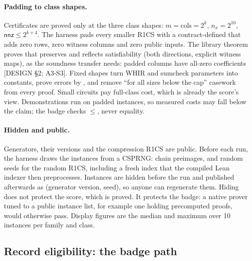 \paragraph{Padding to class shapes.} Certificates are proved only at the three class shapes:
$m=\mathrm{cols}=2^k$, $n_x=2^{10}$, $\mathsf{nnz}\le2^{k+4}$. The harness pads every smaller R1CS
with a contract-defined  that adds zero rows, zero witness columns and zero public inputs.
The library theorem  proves that  preserves and reflects
satisfiability (both directions, explicit witness maps), as the soundness transfer needs: padded
columns have all-zero coefficients [DESIGN §2; A3-S3]. Fixed
shapes turn WHIR and sumcheck parameters into constants, prove errors by , and remove
\enquote{for all sizes below the cap} casework from every proof. Small circuits pay full-class cost,
which is already the score's view. Demonstrations run on padded instances, so measured costs may fall
below the claim; the badge checks $\le$, never equality.

\paragraph{Hidden and public.} Generators, their versions and the compression R1CS are public. Before
each run, the harness draws the instances from a CSPRNG: chain preimages, and random seeds for the
random R1CS, including a fresh index that the compiled Lean indexer then preprocesses. Instances are
hidden before the run and published afterwards as (generator version, seed), so anyone can
regenerate them. Hiding does not protect the score, which is proved. It protects the badge: a native
prover tuned to a public instance list, for example one holding precomputed proofs, would otherwise
pass. Display figures are the median and maximum over 10 instances per family and class.

\subsection{Record eligibility: the badge path}\label{subsec:bench-badge}

